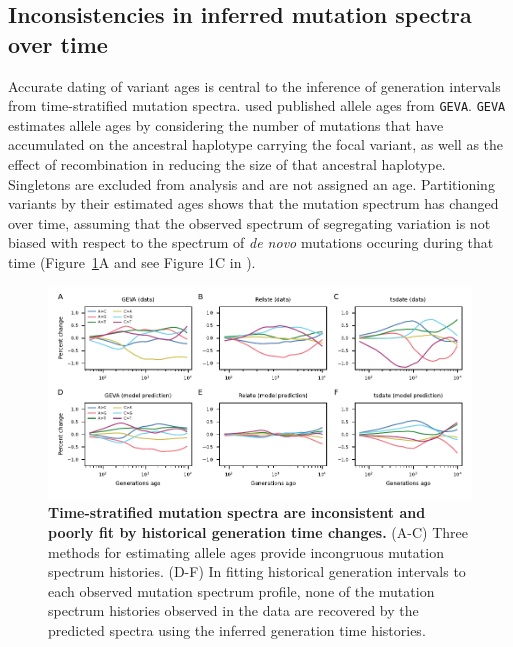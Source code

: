 \documentclass[]{article}
\newcommand{\GEVA}{\texttt{GEVA}\xspace}
\begin{document}
\subsection*{Inconsistencies in inferred mutation spectra over time}

Accurate dating of variant ages is central to the inference of generation
intervals from time-stratified mutation spectra. \citet{wang2023human} used
published allele ages from \GEVA \citep{albers2020dating}. \GEVA estimates
allele ages by considering the number of mutations that have accumulated on the
ancestral haplotype carrying the focal variant, as well as the effect of
recombination in reducing the size of that ancestral haplotype. Singletons are
excluded from analysis and are not assigned an age. Partitioning variants by
their estimated ages shows that the mutation spectrum has changed over time,
assuming that the observed spectrum of segregating variation is not biased with
respect to the spectrum of \emph{de novo} mutations occuring during that time
(Figure~\ref{fig:spectrum-ages}A and see Figure 1C in \citet{wang2023human}).

\begin{figure}[tb!]
    \centering
    \includegraphics{../plots/fig1.pdf}
    \caption{
        \textbf{Time-stratified mutation spectra are inconsistent and poorly
        fit by historical generation time changes.} (A-C) Three methods for
        estimating allele ages provide incongruous mutation spectrum histories.
        (D-F) In fitting historical generation intervals to each observed
        mutation spectrum profile, none of the mutation spectrum histories
        observed in the data are recovered by the predicted spectra using the
        inferred generation time histories.
    }
    \label{fig:spectrum-ages}
\end{figure}
\end{document}
